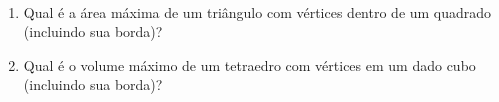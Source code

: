 \ 
\begin{enumerate}[label = (\alph*)]
	\item Qual é a área máxima de um triângulo com vértices dentro de um quadrado (incluindo sua borda)?
	\item Qual é o volume máximo de um tetraedro com vértices em um dado cubo (incluindo sua borda)?
\end{enumerate}
